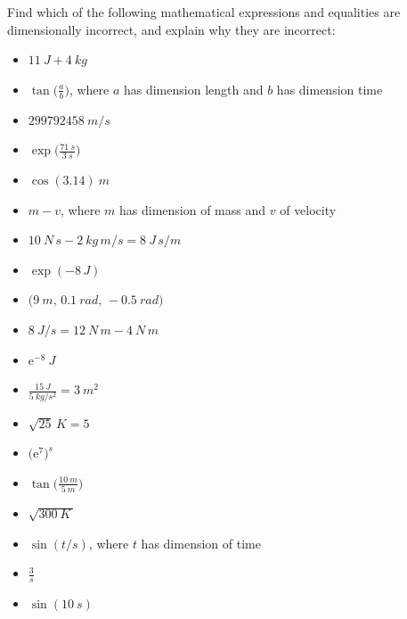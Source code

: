 \documentclass[a4paper,12pt,%
onecolumn,oneside,%
british%
]{memoir}
\newcommand*{\e}{\ensuremath{\mathrm{e}}}
\renewcommand*{\|}[1][]{\nonscript\:#1\vert\nonscript\:\mathopen{}}
\begin{document}
Find which of the following mathematical expressions and equalities are dimensionally incorrect, and explain why they are incorrect:
\begin{itemize}[label=$\triangleright$\enskip,itemsep=1ex]
\item $\displaystyle\qty{11}{J} + \qty{4}{kg}$%
\item $\displaystyle\tan\biggl(\frac{a}{b}\biggr)$, where $a$ has dimension \textsf{length} and $b$ has dimension \textsf{time}%
\item $\displaystyle\qty{299792458}{m/s}$
\item $\displaystyle\exp\biggl(\frac{\qty{71}{s}}{\qty{3}{s}}\biggr)$
\item $\displaystyle\cos(\num{3.14})\:\unit{m}$
\item $\displaystyle m - v$, where $m$ has dimension of \textsf{mass} and $v$ of \textsf{velocity}%
\item $\displaystyle \qty{10}{N\, s}-\qty{2}{kg\, m/s} = \qty{8}{J\, s/m}$
\item $\displaystyle\exp(-8\,\unit{J})$%
\item $\displaystyle\bigl(\qty{9}{m},\, \qty{0.1}{rad},\, -\qty{0.5}{rad}\bigr)$
\item $\displaystyle\qty{8}{J/s}=\qty{12}{N\,m}-\qty{4}{N\,m}$%
\item $\displaystyle\e^{-8}\:\unit{J}$
\item $\displaystyle\frac{\qty{15}{J}}{\qty{5}{kg/s^{2}}} = \qty{3}{m^{2}}$
\item $\displaystyle \sqrt{25}\,\unit{K} = 5$%
\item $\displaystyle\bigl(\e^{7}\bigr)^{\unit{s}}$%
\item $\displaystyle\tan\biggl(\frac{\qty{10}{m}}{\qty{5}{m}}\biggr)$
\item $\displaystyle\sqrt{\qty{300}{K}\,}$
\item $\displaystyle\sin(t/\unit{s})$, where $t$ has dimension of \textsf{time}
\item $\displaystyle\frac{3}{\unit{s}}$
\item $\displaystyle\sin(\qty{10}{s})$%
\end{itemize}
\end{document}
